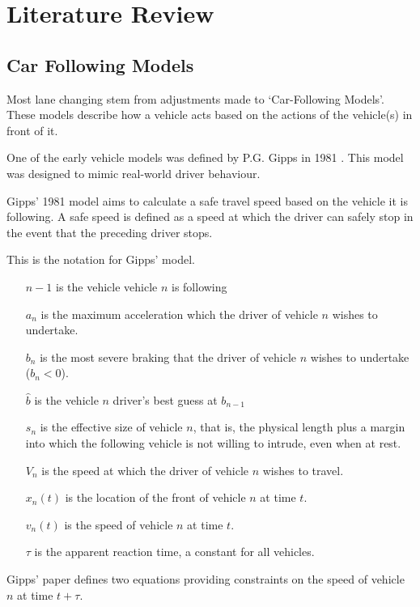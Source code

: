 \chapter{Literature Review}
\label{cha:Literature Review}

\section{Car Following Models}
\label{sec:Car Following Models}
Most lane changing stem from adjustments made to `Car-Following Models'. These models describe how a vehicle acts based on the actions of the vehicle(s) in front of it. 

One of the early vehicle models was defined by P.G. Gipps in 1981 \citep{Gipps1981}. This model was designed to mimic real-world driver behaviour.

Gipps' 1981 model aims to calculate a safe travel speed based on the vehicle it is following. A safe speed is defined as a speed at which the driver can safely stop in the event that the preceding driver stops.

This is the notation for Gipps' model.

\begin{itemize}
\item[$n-1$] is the vehicle vehicle $n$ is following 
\item[$a_n$] is the maximum acceleration which the driver of vehicle $n$ wishes to undertake.
\item[$b_n$] is the most severe braking that the driver of vehicle $n$ wishes to undertake ($b_n < 0$).
\item[$\hat{b}$] is the vehicle $n$ driver's best guess at $b_{n-1}$
\item[$s_n$] is the effective size of vehicle $n$, that is, the physical length plus a margin into which the following vehicle is not willing to intrude, even when at rest.
\item[$V_n$] is the speed at which the driver of vehicle $n$ wishes to travel.
\item[$x_n(t)$] is the location of the front of vehicle $n$ at time $t$.
\item[$v_n(t)$] is the speed of vehicle $n$ at time $t$.
\item[$\tau$] is the apparent reaction time, a constant for all vehicles.
\end{itemize}

Gipps' paper defines two equations providing constraints on the speed of vehicle $n$ at time $t + \tau$. 

